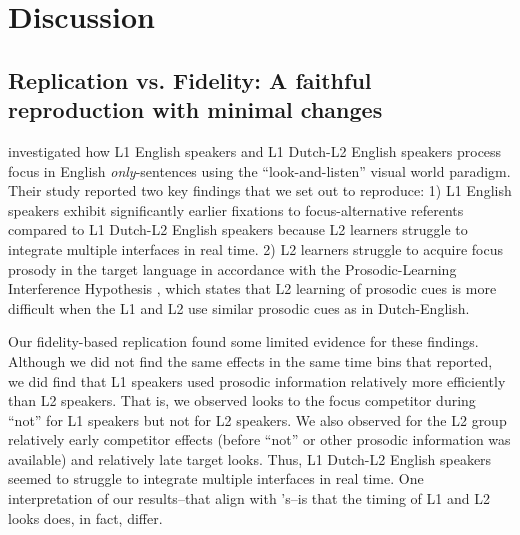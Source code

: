 
\section{Discussion}
\subsection{Replication vs. Fidelity: A faithful reproduction with minimal changes}

\textcite{ge2021a} investigated how L1 English speakers and L1 Dutch-L2 English speakers process focus in English \textit{only}-sentences using the “look-and-listen” visual world paradigm. Their study reported two key findings that we set out to reproduce: 1) L1 English speakers exhibit significantly earlier fixations to focus-alternative referents compared to L1 Dutch-L2 English speakers because L2 learners struggle to integrate multiple interfaces in real time. 2) L2 learners struggle to acquire focus prosody in the target language in accordance with the Prosodic-Learning Interference Hypothesis \parencite{tremblay2016effects, tremblay2021re}, which states that L2 learning of prosodic cues is more difficult when the L1 and L2 use similar prosodic cues as in Dutch-English.

Our fidelity-based replication found some limited evidence for these findings. Although we did not find the same effects in the same time bins that \textcite{ge2021a} reported, we did find that L1 speakers used prosodic information relatively more efficiently than L2 speakers. That is, we observed looks to the focus competitor during “not” for L1 speakers but not for L2 speakers. We also observed for the L2 group relatively early competitor effects (before “not” or other prosodic information was available) and relatively late target looks. Thus, L1 Dutch-L2 English speakers seemed to struggle to integrate multiple interfaces in real time. One interpretation of our results--that align with \textcite{ge2021a}'s--is that the timing of L1 and L2 looks does, in fact, differ. 

